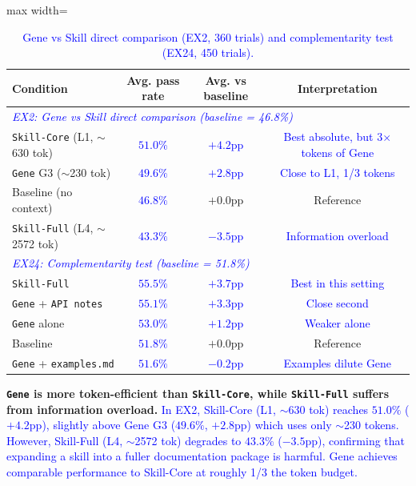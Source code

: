 \documentclass{article}
\newcommand{\blue}[1]{\textcolor{blue}{#1}}
\newcommand{\nbf}[1]{{\noindent \textbf{#1}}}
\begin{document}
\begin{table}[h]
\centering
\caption{\blue{Gene vs Skill direct comparison (EX2, 360 trials) and complementarity test (EX24, 450 trials).}}
\label{tab:gene_vs_skill}
\begin{adjustbox}{max width=\columnwidth}
\begin{tabular}{lccc}
\toprule
\textbf{Condition} & \textbf{Avg. pass rate} & \textbf{Avg. vs baseline} & \textbf{Interpretation} \\
\midrule
\multicolumn{4}{l}{\textit{\blue{EX2: Gene vs Skill direct comparison (baseline = 46.8\%)}}} \\
\texttt{Skill-Core} (L1, $\sim$630 tok) & \blue{$51.0\%$} & \blue{$+4.2$pp} & \blue{Best absolute, but 3$\times$ tokens of Gene} \\
\texttt{Gene} G3 ($\sim$230 tok) & \blue{$49.6\%$} & \blue{$+2.8$pp} & \blue{Close to L1, 1/3 tokens} \\
Baseline (no context) & \blue{$46.8\%$} & $+0.0$pp & Reference \\
\texttt{Skill-Full} (L4, $\sim$2572 tok) & \blue{$43.3\%$} & \blue{$-3.5$pp} & \blue{Information overload} \\
\midrule
\multicolumn{4}{l}{\textit{\blue{EX24: Complementarity test (baseline = 51.8\%)}}} \\
\texttt{Skill-Full} & \blue{$55.5\%$} & \blue{$+3.7$pp} & \blue{Best in this setting} \\
\texttt{Gene} + \texttt{API notes} & \blue{$55.1\%$} & \blue{$+3.3$pp} & \blue{Close second} \\
\texttt{Gene} alone & \blue{$53.0\%$} & \blue{$+1.2$pp} & \blue{Weaker alone} \\
Baseline & \blue{$51.8\%$} & $+0.0$pp & Reference \\
\texttt{Gene} + \texttt{examples.md} & \blue{$51.6\%$} & \blue{$-0.2$pp} & \blue{Examples dilute Gene} \\
\bottomrule
\end{tabular}
\end{adjustbox}
\end{table}


\nbf{\texttt{Gene} is more token-efficient than \texttt{Skill-Core}, while \texttt{Skill-Full} suffers from information overload.}
\blue{In EX2, Skill-Core (L1, $\sim$630 tok) reaches $51.0\%$ ($+4.2$pp), slightly above Gene G3 ($49.6\%$, $+2.8$pp) which uses only $\sim$230 tokens. However, Skill-Full (L4, $\sim$2572 tok) degrades to $43.3\%$ ($-3.5$pp), confirming that expanding a skill into a fuller documentation package is harmful. Gene achieves comparable performance to Skill-Core at roughly 1/3 the token budget.}
\end{document}
